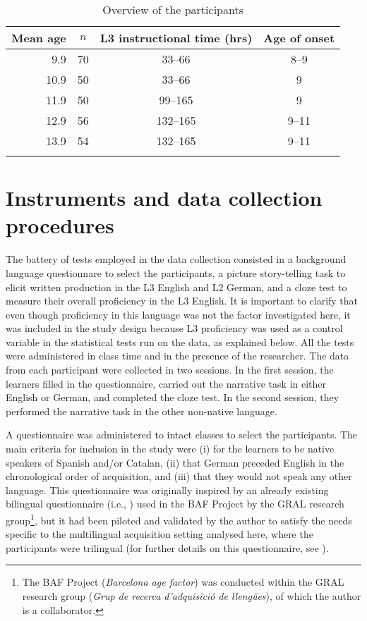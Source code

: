 \documentclass[output=paper,modfonts,nonflat, newtxmath]{langsci/langscibook}
\begin{document}
\begin{table}
\caption{Overview of the participants\label{tab:sanchez7:2}}
\begin{tabular}{r c c c}
\lsptoprule
Mean age & $n$ & L3 instructional time (hrs) & Age of onset\\
\midrule
9.9 & 70 & 33--66  & 8--9\\
10.9 & 50 & 33--66 & 9\\
11.9 & 50 & \hphantom{1}99--165  & 9\\
12.9 & 56 & 132--165 & 9--11\\
13.9 & 54 & 132--165 & 9--11\\
\lspbottomrule
\end{tabular}
\end{table}

\section{{Instruments} {and} {data} {collection} {procedures} }
\label{sec:sanchez7:5}

The battery of tests employed in the data collection consisted in a background language questionnare to select the participants, a picture story-telling task to elicit written production in the L3 English and L2 German, and a cloze test to measure their overall proficiency in the L3 English. It is important to clarify that even though proficiency in this language was not the factor investigated here, it was included in the study design because L3 proficiency was used as a control variable in the statistical tests run on the data, as explained below. All the tests were administered in class time and in the presence of the researcher. The data from each participant were collected in two sessions. In the first session, the learners filled in the questionnaire, carried out the narrative task in either English or German, and completed the cloze test. In the second session, they performed the narrative task in the other non-native language.

A questionnaire was administered to intact classes to select the participants. The main criteria for inclusion in the study were (i) for the learners to be native speakers of Spanish and/or Catalan, (ii) that German preceded English in the chronological order of acquisition, and (iii) that they would not speak any other language. This questionnaire was originally inspired by an already existing bilingual questionnaire (i.e., \citealt{BakerPrys1998}) used in the BAF Project by the GRAL research group\footnote{The BAF Project (\textit{Barcelona age factor}) was conducted within the GRAL research group (\textit{Grup de recerca d’adquisició de llengües}), of which the author is a collaborator.}, but it had been piloted and validated by the author \citep{Sánchez2011} to satisfy the needs specific to the multilingual acquisition setting analysed here, where the participants were trilingual (for further details on this questionnaire, see \citealt{Sánchez2015L2}).
\end{document}
